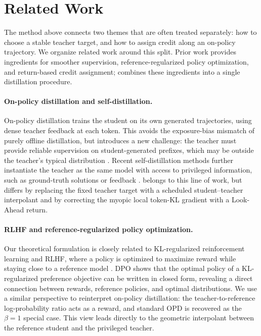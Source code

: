 \section{Related Work}
\label{sec:related_work}

The method above connects two themes that are often treated separately: how to choose a stable teacher target, and how to assign credit along an on-policy trajectory. We organize related work around this split. Prior work provides ingredients for smoother supervision, reference-regularized policy optimization, and return-based credit assignment; \ours{} combines these ingredients into a single distillation procedure.

\paragraph{On-policy distillation and self-distillation.} On-policy distillation trains the student on its own generated trajectories, using dense
teacher feedback at each token. This avoids the exposure-bias mismatch of purely offline
distillation, but introduces a new challenge: the teacher must provide reliable supervision
on student-generated prefixes, which may be outside the teacher's typical distribution \citep{li2026rethinking, jang2026stable}.
Recent self-distillation methods further instantiate the teacher as the same model with
access to privileged information, such as ground-truth solutions or feedback \citep{zhao2026self, liu2026self, yang2026self, shen2026anti, zhang2026opsdl, hubotter2026reinforcement, he2026self}. \ours{} belongs to this line of work, but differs by replacing the fixed teacher target with a scheduled
student--teacher interpolant and by correcting the myopic local token-KL gradient with a
Look-Ahead return.

\paragraph{RLHF and reference-regularized policy optimization.}
Our theoretical formulation is closely related to KL-regularized reinforcement learning and
RLHF, where a policy is optimized to maximize reward while staying close to a reference
model \citep{ziegler2019fine, ouyang2022training, schulman2017proximal}. DPO shows that the optimal policy of
a KL-regularized preference objective can be written in closed form, revealing a direct
connection between rewards, reference policies, and optimal distributions. We use a similar
perspective to reinterpret on-policy distillation: the teacher-to-reference log-probability
ratio acts as a reward, and standard OPD is recovered as the $\beta=1$ special case. This
view leads directly to the geometric interpolant between the reference student and the
privileged teacher.

